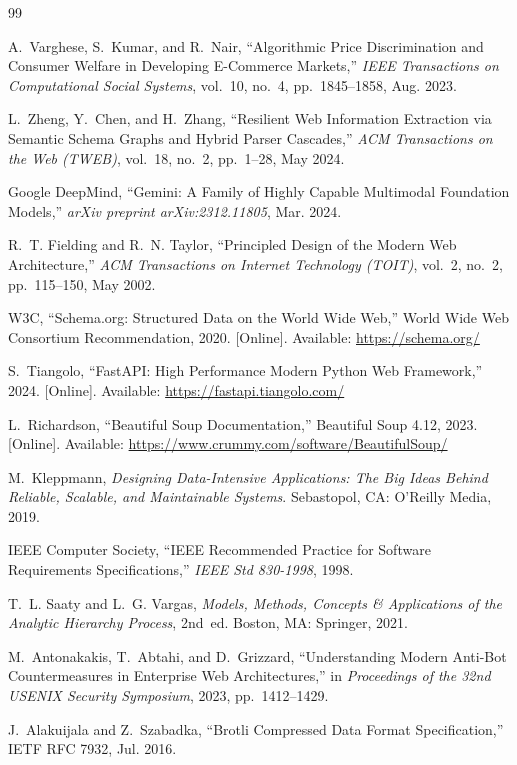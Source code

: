 \documentclass[12pt,a4paper,oneside]{report}
\begin{document}
\begin{thebibliography}{99}

A.~Varghese, S.~Kumar, and R.~Nair, ``Algorithmic Price Discrimination and Consumer Welfare in Developing E-Commerce Markets,'' \emph{IEEE Transactions on Computational Social Systems}, vol.~10, no.~4, pp.~1845--1858, Aug. 2023.

L.~Zheng, Y.~Chen, and H.~Zhang, ``Resilient Web Information Extraction via Semantic Schema Graphs and Hybrid Parser Cascades,'' \emph{ACM Transactions on the Web (TWEB)}, vol.~18, no.~2, pp.~1--28, May 2024.

Google DeepMind, ``Gemini: A Family of Highly Capable Multimodal Foundation Models,'' \emph{arXiv preprint arXiv:2312.11805}, Mar. 2024.

R.~T. Fielding and R.~N. Taylor, ``Principled Design of the Modern Web Architecture,'' \emph{ACM Transactions on Internet Technology (TOIT)}, vol.~2, no.~2, pp.~115--150, May 2002.

W3C, ``Schema.org: Structured Data on the World Wide Web,'' World Wide Web Consortium Recommendation, 2020. [Online]. Available: \url{https://schema.org/}

S.~Tiangolo, ``FastAPI: High Performance Modern Python Web Framework,'' 2024. [Online]. Available: \url{https://fastapi.tiangolo.com/}

L.~Richardson, ``Beautiful Soup Documentation,'' Beautiful Soup 4.12, 2023. [Online]. Available: \url{https://www.crummy.com/software/BeautifulSoup/}

M.~Kleppmann, \emph{Designing Data-Intensive Applications: The Big Ideas Behind Reliable, Scalable, and Maintainable Systems}. Sebastopol, CA: O'Reilly Media, 2019.

IEEE Computer Society, ``IEEE Recommended Practice for Software Requirements Specifications,'' \emph{IEEE Std 830-1998}, 1998.

T.~L. Saaty and L.~G. Vargas, \emph{Models, Methods, Concepts \& Applications of the Analytic Hierarchy Process}, 2nd~ed. Boston, MA: Springer, 2021.

M.~Antonakakis, T.~Abtahi, and D.~Grizzard, ``Understanding Modern Anti-Bot Countermeasures in Enterprise Web Architectures,'' in \emph{Proceedings of the 32nd USENIX Security Symposium}, 2023, pp.~1412--1429.

J.~Alakuijala and Z.~Szabadka, ``Brotli Compressed Data Format Specification,'' IETF RFC 7932, Jul. 2016.

\end{thebibliography}
\end{document}
